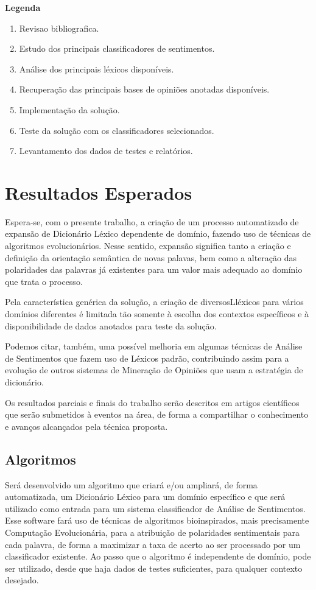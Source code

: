 \documentclass[a4paper,11pt]{article}
\begin{document}
\begin{center}
\large \textbf{Legenda}
\end{center}

\begin{enumerate}[D1.]
\item{Revisao bibliografica.}
\item{Estudo dos principais classificadores de sentimentos.}
\item{Análise dos principais léxicos disponíveis.}
\item{Recuperação das principais bases de opiniões anotadas disponíveis.}
\item{Implementação da solução.}
\item{Teste da solução com os classificadores selecionados.}
\item{Levantamento dos dados de testes e relatórios.}
\end{enumerate}

\section{Resultados Esperados}
\label{sec:result}
Espera-se, com o presente trabalho, a criação de um processo automatizado de expansão de Dicionário Léxico dependente de domínio, fazendo uso de técnicas de algoritmos evolucionários. Nesse sentido, expansão significa tanto a criação e definição da orientação semântica de novas palavas, bem como a alteração das polaridades das palavras já existentes para um valor mais adequado ao domínio que trata o processo.

Pela característica genérica da solução, a criação de diversosLléxicos para vários domínios diferentes é limitada tão somente à escolha dos contextos específicos e à disponibilidade de dados anotados para teste da solução.

Podemos citar, também, uma possível melhoria em algumas técnicas de Análise de Sentimentos que fazem uso de Léxicos padrão, contribuindo assim para a evolução de outros sistemas de Mineração de Opiniões que usam a estratégia de dicionário.

Os resultados parciais e finais do trabalho serão descritos em artigos científicos que serão submetidos à eventos na área, de forma a compartilhar o conhecimento e avanços alcançados pela técnica proposta.

\subsection{Algoritmos} %
Será desenvolvido um algoritmo que criará e/ou ampliará, de forma automatizada, um Dicionário Léxico para um domínio específico e que será utilizado como entrada para um sistema classificador de Análise de Sentimentos.
Esse software fará uso de técnicas de algoritmos bioinspirados, mais precisamente Computação Evolucionária, para a atribuição de polaridades sentimentais para cada palavra, de forma a maximizar a taxa de acerto ao ser processado por um classificador existente.
Ao passo que o algoritmo é independente de domínio, pode ser utilizado, desde que haja dados de testes suficientes, para qualquer contexto desejado.
\end{document}
